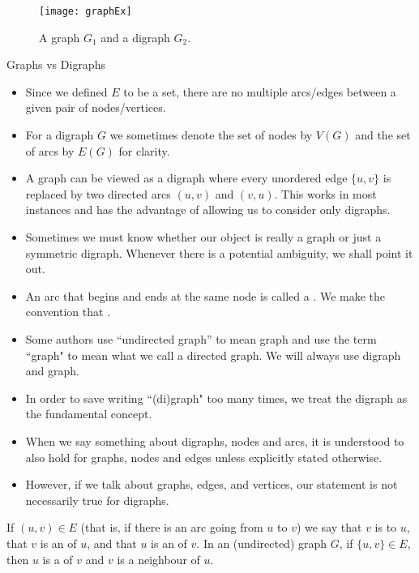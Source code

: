 \begin{figure}
  \centering
  \texttt{[image: graphEx]}
  \caption{A graph $G_1$ and a digraph $G_2$.}
  \label{fig:graphExample}
\end{figure}


\begin{note}
Graphs vs Digraphs
\begin{itemize}
  \item Since we defined $E$ to be a set, there are no multiple arcs/edges
  between a given pair of nodes/vertices.
  \item For a digraph $G$ we sometimes denote the set of nodes by $V(G)$
  and the set of arcs by $E(G)$ for clarity.
  \item A graph can be viewed as a digraph where every unordered edge $\{u, v\}$ 
  is replaced by two directed arcs $(u, v)$ and $(v, u)$.  
  This works in most instances and has the advantage of allowing us to consider only digraphs.
  \item Sometimes we must know whether our object is really a graph or just a symmetric digraph. Whenever there
  is a potential ambiguity, we shall point it out.
  \item  An arc that begins and ends at the same node is called a . 
  We make the convention that . 
  \item Some authors use ``undirected graph'' to mean graph and use the term ``graph" to mean what we call a directed graph. We will always use digraph and graph.
  \item In order to save writing ``(di)graph" too many times, we treat the digraph as the fundamental concept.
  \item When we say something about digraphs, nodes and arcs, it is understood to also hold for graphs, nodes and edges unless explicitly stated otherwise. 
  \item However, if we talk about graphs, edges, and vertices, our statement is not necessarily true for digraphs. 
\end{itemize}
\end{note}


\begin{Definition}\label{def:adjacent}  
If $(u, v)\in E$ (that is, if there is an arc going from $u$ to $v$) we say that $v$ is  
to $u$, that $v$ is an  of $u$, and that $u$ is an  of $v$.
In an (undirected) graph $G$, if $\{u, v\} \in E$, then $u$ is a  of $v$ and $v$ is a neighbour of $u$. 
\end{Definition}

